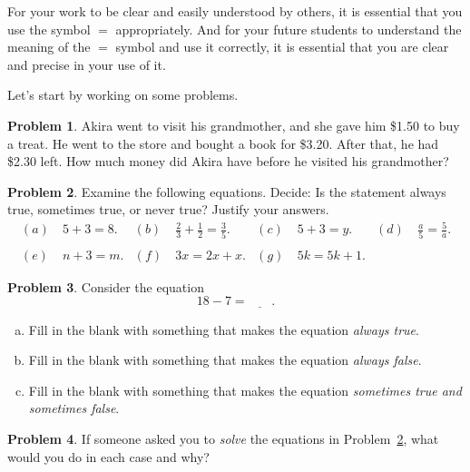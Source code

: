 \documentclass[12pt, reqno]{amsart}
\theoremstyle{remark}
\theoremstyle{definition}
\newtheorem{problem}{Problem}
\numberwithin{equation}{section}  %
\begin{document}
For your work to be clear and easily understood by others, it is essential that you use the symbol $=$ appropriately.  And for your future students to understand the meaning of the $=$ symbol and use it correctly, it is essential that you  are clear and precise in your use of it.

Let's start by working on some problems.

\begin{problem}\label{prob: grandma}
Akira went to visit his grandmother, and she gave him \$1.50 to buy a treat.
He went to the store and bought a book for \$3.20.   After that, he had \$2.30 left.
How much money did Akira have before he visited his grandmother?
\end{problem}

\bigskip

\begin{problem}\label{prob: equations}
Examine the following equations.  Decide: Is the statement always true, sometimes true, or never true?  Justify your answers.
\begin{align*}
(a) &\ 5 + 3 = 8.
&
(b) &\ \frac 23 + \frac 12 = \frac 35.
&
(c) & \ 5 + 3 = y.
& (d)& \ 
\frac a 5 = \frac 5 a.
\\
\\
(e) & \ n + 3 = m.
&
(f) & \ 3x = 2x + x.
&
(g)& \ 
5k = 5k + 1.
\end{align*}


\end{problem}

\bigskip


\begin{problem}\label{prob: equations2}
Consider the equation
\[ 
18 - 7 = \underline{\phantom{blah}}.
\]

\begin{enumerate}[(a)]
\item
Fill in the blank with something that makes the equation \emph{always true}.\\
\item
Fill in the blank with something that makes the equation \emph{always false}.\\
\item
Fill in the blank with something that makes the equation \emph{sometimes true and sometimes false}.
\end{enumerate}
\end{problem}



\bigskip


\begin{problem}
If someone asked you to \emph{solve} the equations in Problem~\ref{prob: equations}, what would you do in each case and why?
\end{problem}
\end{document}
